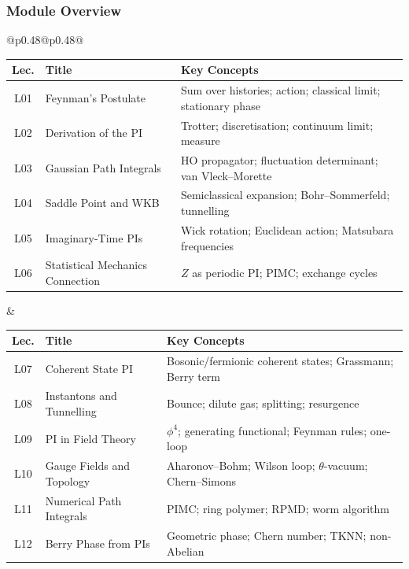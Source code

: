 \documentclass[11pt,a4paper]{article}
\begin{document}
\subsubsection*{Module Overview}
\begin{center}
\begin{tabular}{@{}p{}@{\textwidth}p{}@{}}
\begin{tabular}[t]{@{}clp{4.5cm}@{}}
\toprule
\textbf{Lec.} & \textbf{Title} & \textbf{Key Concepts}\\
\midrule
L01 & Feynman's Postulate & Sum over histories; action; classical limit; stationary phase\\
L02 & Derivation of the PI & Trotter; discretisation; continuum limit; measure\\
L03 & Gaussian Path Integrals & HO propagator; fluctuation determinant; van Vleck--Morette\\
L04 & Saddle Point and WKB & Semiclassical expansion; Bohr--Sommerfeld; tunnelling\\
L05 & Imaginary-Time PIs & Wick rotation; Euclidean action; Matsubara frequencies\\
L06 & Statistical Mechanics Connection & $Z$ as periodic PI; PIMC; exchange cycles\\
\bottomrule
\end{tabular}
&
\begin{tabular}[t]{@{}clp{4.5cm}@{}}
\toprule
\textbf{Lec.} & \textbf{Title} & \textbf{Key Concepts}\\
\midrule
L07 & Coherent State PI & Bosonic/fermionic coherent states; Grassmann; Berry term\\
L08 & Instantons and Tunnelling & Bounce; dilute gas; splitting; resurgence\\
L09 & PI in Field Theory & $\phi^4$; generating functional; Feynman rules; one-loop\\
L10 & Gauge Fields and Topology & Aharonov--Bohm; Wilson loop; $\theta$-vacuum; Chern--Simons\\
L11 & Numerical Path Integrals & PIMC; ring polymer; RPMD; worm algorithm\\
L12 & Berry Phase from PIs & Geometric phase; Chern number; TKNN; non-Abelian\\
\bottomrule
\end{tabular}
\\
\end{tabular}
\end{center}
\end{document}
